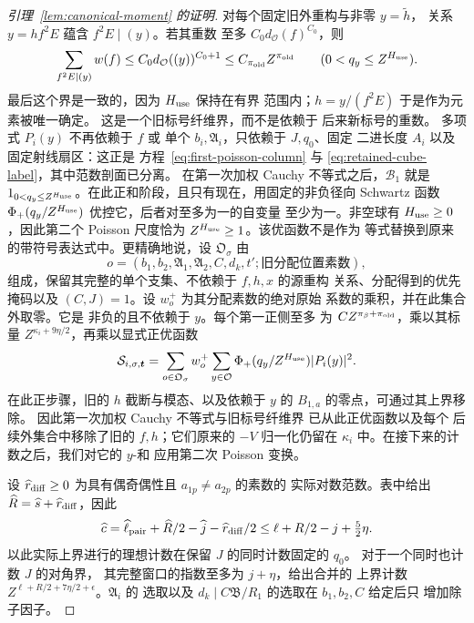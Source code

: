 \documentclass[11pt,a4paper]{article}
\numberwithin{equation}{section}
\numberwithin{figure}{section}
\theoremstyle{definition}
\theoremstyle{remark}
\begin{document}
\begin{proof}[引理~\ref{lem:canonical-moment} 的证明]
对每个固定旧外重构与非零 \(y=\widetilde h\)，
关系 \(y=hf^2E\) 蕴含 \(f^2E\mid(y)\)。若其重数
至多 \(C_0d_{\mathcal O}(f)^{C_0}\)，则
\begin{equation}\label{eq:inverse-old-label-fibre}
 \sum_{f^2E\mid(y)}w(f)
 \le C_0d_{\mathcal O}((y))^{C_0+1}
 \le C_{\pi_{\rm old}}Z^{\pi_{\rm old}}
 \qquad(0<q_y\le Z^{H_{\rm use}}).
\end{equation}
最后这个界是一致的，因为 \(H_{\rm use}\) 保持在有界
范围内；\(h=y/(f^2E)\) 于是作为元素被唯一确定。
这是一个旧标号纤维界，而不是依赖于
后来新标号的重数。
多项式 \(P_i(y)\) 不再依赖于 \(f\) 或
单个 \(b_i,\mathfrak A_i\)，只依赖于 \(J,q_0\)、固定
二进长度 \(A_i\) 以及固定射线扇区：这正是
方程~\eqref{eq:first-poisson-column} 与
\eqref{eq:retained-cube-label}，其中范数剖面已分离。
在第一次加权 Cauchy 不等式之后，\(\mathcal B_1\) 就是
\(1_{0<q_y\le Z^{H_{\rm use}}}\)。在此正和阶段，且只有现在，用固定的非负径向 Schwartz 函数
\(\Phi_+(q_y/Z^{H_{\rm use}})\) 优控它，后者对至多为一的自变量
至少为一。非空球有 \(H_{\rm use}\ge0\)，因此第二个 Poisson
尺度恰为 \(Z^{H_{\rm use}}\ge1\)。该优函数不是作为
等式替换到原来的带符号表达式中。更精确地说，设
\(\mathfrak O_\sigma\) 由
\[
 o=(b_1,b_2,\mathfrak A_1,\mathfrak A_2,C,d_k,t';
       \text{旧分配位置素数}),
\]
组成，保留其完整的单个支集、不依赖于 \(f,h,x\) 的源重构
关系、分配得到的优先掩码以及
\((C,J)=1\)。设 \(w_o^+\) 为其分配素数的绝对原始
系数的乘积，并在此集合外取零。它是
非负的且不依赖于 \(y\)。每个第一正侧至多
为 \(C Z^{\pi_\beta+\pi_{\rm old}}\)，乘以其标量
\(Z^{\kappa_i+9\eta/2}\)，再乘以显式正优函数
\begin{equation}\label{eq:inverse-first-majorant}
 \mathcal S_{i,\sigma,\boldsymbol t}
 =\sum_{o\in\mathfrak O_\sigma}w_o^+
    \sum_{y\in\mathcal O}\Phi_+(q_y/Z^{H_{\rm use}})|P_i(y)|^2.
\end{equation}
在此正步骤，旧的 \(h\) 截断与模态、以及依赖于 \(y\) 的
\(B_{1,a}\) 的零点，可通过其上界移除。
因此第一次加权 Cauchy 不等式与旧标号纤维界
已从此正优函数以及每个
后续外集合中移除了旧的 \(f,h\)；它们原来的 \(-V\) 归一化仍留在
\(\kappa_i\) 中。在接下来的计数之后，我们对它的 \(y\)-和
应用第二次 Poisson 变换。

设 \(\widehat r_{\rm diff}\ge0\) 为具有偶奇偶性且 \(a_{1p}\ne a_{2p}\) 的素数的
实际对数范数。表中给出
\(\widehat R=\widehat s+\widehat r_{\rm diff}\)，因此
\begin{equation}\label{eq:fixed-cube-count}
 \widehat c=\widehat\ell_{\rm pair}+\widehat R/2-\widehat j
                  -\widehat r_{\rm diff}/2
 \le\ell+R/2-j+\tfrac52\eta.
\end{equation}
以此实际上界进行的理想计数在保留 \(J\) 的同时计数固定的 \(q_0\)。
对于一个同时也计数 \(J\) 的对角界，
其完整窗口的指数至多为 \(j+\eta\)，给出合并的
上界计数 \(Z^{\ell+R/2+7\eta/2+\epsilon}\)。\(\mathfrak A_i\) 的
选取以及 \(d_k\mid C\mathfrak B/R_1\) 的选取在 \(b_1,b_2,C\) 给定后只
增加除子因子。


\end{proof}
\end{document}
